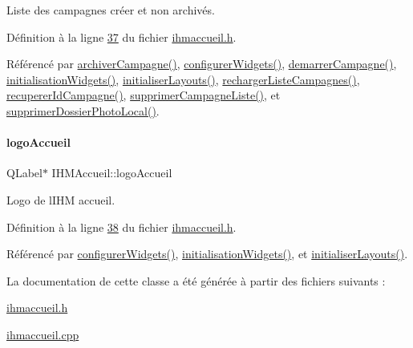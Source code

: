 Liste des campagnes créer et non archivés. 



Définition à la ligne \hyperlink{ihmaccueil_8h_source_l00037}{37} du fichier \hyperlink{ihmaccueil_8h_source}{ihmaccueil.\+h}.



Référencé par \hyperlink{ihmaccueil_8cpp_source_l00350}{archiver\+Campagne()}, \hyperlink{ihmaccueil_8cpp_source_l00077}{configurer\+Widgets()}, \hyperlink{ihmaccueil_8cpp_source_l00323}{demarrer\+Campagne()}, \hyperlink{ihmaccueil_8cpp_source_l00037}{initialisation\+Widgets()}, \hyperlink{ihmaccueil_8cpp_source_l00049}{initialiser\+Layouts()}, \hyperlink{ihmaccueil_8cpp_source_l00092}{recharger\+Liste\+Campagnes()}, \hyperlink{ihmaccueil_8cpp_source_l00205}{recuperer\+Id\+Campagne()}, \hyperlink{ihmaccueil_8cpp_source_l00189}{supprimer\+Campagne\+Liste()}, et \hyperlink{ihmaccueil_8cpp_source_l00234}{supprimer\+Dossier\+Photo\+Local()}.

\mbox{\label{class_i_h_m_accueil_a709440124f3307589eee68c517833e6d}} 
\paragraph{\texorpdfstring{logo\+Accueil}{logoAccueil}}
{\footnotesize\ttfamily Q\+Label$\ast$ I\+H\+M\+Accueil\+::logo\+Accueil\hspace{0.3cm}{\ttfamily [private]}}



Logo de l\textquotesingle{}I\+HM accueil. 



Définition à la ligne \hyperlink{ihmaccueil_8h_source_l00038}{38} du fichier \hyperlink{ihmaccueil_8h_source}{ihmaccueil.\+h}.



Référencé par \hyperlink{ihmaccueil_8cpp_source_l00077}{configurer\+Widgets()}, \hyperlink{ihmaccueil_8cpp_source_l00037}{initialisation\+Widgets()}, et \hyperlink{ihmaccueil_8cpp_source_l00049}{initialiser\+Layouts()}.



La documentation de cette classe a été générée à partir des fichiers suivants \+:\begin{DoxyCompactItemize}
\item 
\hyperlink{ihmaccueil_8h}{ihmaccueil.\+h}\item 
\hyperlink{ihmaccueil_8cpp}{ihmaccueil.\+cpp}\end{DoxyCompactItemize}
